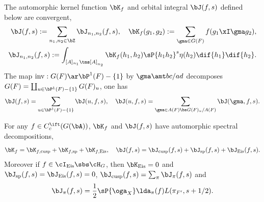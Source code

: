\documentclass[a4paper, twoside]{article}
\begin{document}
\begin{thm}
	The automorphic kernel function $\bK_{f}$ and orbital integral $\bJ(f,s)$ defined below are convergent,
	\begin{align*}
	  \bJ(f,s):=\sum_{n_{1},n_{2}\in\bZ}\bJ_{n_{1},n_{2}}(f,s),\quad \bK_{f}(g_{1},g_{2}):=\sum_{\gma\in G(F)}f(g_{1}\xI\gma g_{2}), \\ \bJ_{n_{1},n_{2}}(f,s):=\int_{[A]_{n_{1}}\tms[A]_{n_{2}}}\bK_{f}(h_{1},h_{2})\sP{h_{1}h_{2}}^{s}\eta(h_{2})\dif{h_{1}}\dif{h_{2}}.
	\end{align*}
	The map $\mathrm{inv}:G(F)\ar\bP^{1}(F)-\{1\}$ by $\gma\amt bc/ad$ decomposes $G(F)=\coprod_{u\in\bP^{1}(F)-\{1\}}G(F)_{u}$, one has
	\[
		\bJ(f,s)=\sum_{u\in\bP^{1}(F)-\{1\}}\bJ(u,f,s),\quad \bJ(u,f,s)=\sum_{\gma\in A(F)\bs G(F)_{u}/A(F)}\bJ(\gma,f,s).
	\]
\end{thm}

\begin{thm}
	For any $f\in C_{c}^{\ift}(G(\bA))$, $\bK_{f}$ and $\bJ(f,s)$ have automorphic spectral decompositions,
	\[
		\bK_{f}=\bK_{f, \mathrm{cusp}}+\bK_{f, \mathrm{sp}}+\bK_{f, \mathrm{Eis}},\quad \bJ(f,s)=\bJ_{\mathrm{cusp}}(f,s)+\bJ_{\mathrm{sp}}(f,s)+\bJ_{\mathrm{Eis}}(f,s).
	\]
	Moreover if $f\in\cI_{\mathrm{Eis}}\sbs\cH_{G}$, then $\bK_{\mathrm{Eis}}=0$ and $\bJ_{\mathrm{sp}}(f,s)=\bJ_{\mathrm{Eis}}(f,s)=0$, $\bJ_{\mathrm{cusp}}(f,s)=\sum_{\pi}\bJ_{\pi}(f,s)$ and
	\[
		\bJ_{\pi}(f,s)=\frac{1}{2}\sP{\oga_{X}}\lda_{\pi}(f)L(\pi_{F'},s+1/2).
	\]
\end{thm}


\end{document}
